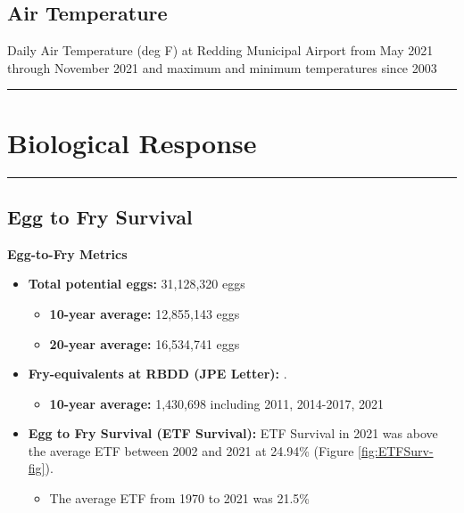 \documentclass[
]{book}
\providecommand{\tightlist}{%
  \setlength{\itemsep}{0pt}\setlength{\parskip}{0pt}}
\theoremstyle{definition}
\theoremstyle{definition}
\theoremstyle{definition}
\theoremstyle{definition}
\theoremstyle{remark}
\begin{document}
\hypertarget{air-temperature}{%
\subsection{Air Temperature}\label{air-temperature}}

\label{fig:KRDDatemp-fig}Daily Air Temperature (deg F) at Redding Municipal Airport from May 2021 through November 2021 and maximum and minimum temperatures since 2003

\begin{center}\rule{0.5\linewidth}{0.5pt}\end{center}

\hypertarget{biological-response-1}{%
\section{Biological Response}\label{biological-response-1}}

\begin{center}\rule{0.5\linewidth}{0.5pt}\end{center}

\hypertarget{egg-to-fry-survival}{%
\subsection{Egg to Fry Survival}\label{egg-to-fry-survival}}

\textbf{Egg-to-Fry Metrics}

\begin{itemize}
\tightlist
\item
  \textbf{Total potential eggs:} 31,128,320 eggs

  \begin{itemize}
  \tightlist
  \item
    \textbf{10-year average:} 12,855,143 eggs
  \item
    \textbf{20-year average:} 16,534,741 eggs
  \end{itemize}
\item
  \textbf{Fry-equivalents at RBDD (JPE Letter):} .

  \begin{itemize}
  \tightlist
  \item
    \textbf{10-year average:} 1,430,698 including 2011, 2014-2017, 2021
  \end{itemize}
\item
  \textbf{Egg to Fry Survival (ETF Survival):} ETF Survival in 2021 was above the average ETF between 2002 and 2021 at 24.94\% (Figure \ref{fig:ETFSurv-fig}).

  \begin{itemize}
  \tightlist
  \item
    The average ETF from 1970 to 2021 was 21.5\%
  \end{itemize}
\end{itemize}
\end{document}
